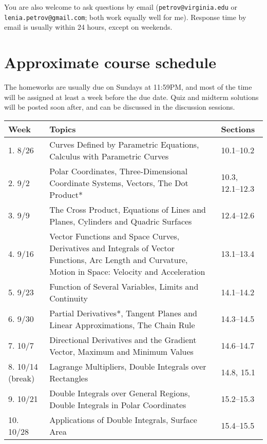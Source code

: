 \documentclass[oneside,11pt]{amsart}
\theoremstyle{definition}
\begin{document}
You are also welcome to ask questions by email (\texttt{petrov@virginia.edu} or
\texttt{lenia.petrov@gmail.com}; both work equally well for me). Response time by email is usually within 24 hours, except on weekends.

\section{Approximate course schedule}

The homeworks are usually due on Sundays at 11:59PM, and most of the time will be assigned at least a week before the due date. Quiz and midterm solutions will be posted soon after, and can be discussed in the discussion sessions.


\vspace{5pt}


\begin{center}
\begin{longtable}{|l|p{}|l|}
    \hline
    \textbf{Week} & \textbf{Topics} & \textbf{Sections} \\
    \hline
    1. 8/26 & Curves Defined by Parametric Equations, Calculus with Parametric Curves & 10.1--10.2 \\
    \hline
    2. 9/2 & Polar Coordinates, Three-Dimensional Coordinate Systems, Vectors, The Dot Product* & 10.3, 12.1--12.3 \\
    \hline
    3. 9/9 & The Cross Product, Equations of Lines and Planes, Cylinders and Quadric Surfaces & 12.4--12.6 \\
    \hline
		4. 9/16 & Vector Functions and Space Curves, Derivatives and Integrals of Vector Functions, Arc Length and Curvature,
		 Motion in Space: Velocity and Acceleration& 13.1--13.4 \\
    \hline
    5. 9/23 & Function of Several Variables, Limits and Continuity & 14.1--14.2 \\
    \hline
    6. 9/30 & Partial Derivatives*, Tangent Planes and Linear Approximations, The Chain Rule & 14.3--14.5 \\
    \hline
    7. 10/7 & Directional Derivatives and the Gradient Vector, Maximum and Minimum Values & 14.6--14.7 \\
    \hline
		8. 10/14 (break) & Lagrange Multipliers, Double Integrals over Rectangles & 14.8, 15.1 \\
    \hline
    9. 10/21 & Double Integrals over General Regions, Double Integrals in Polar Coordinates & 15.2--15.3 \\
    \hline
    10. 10/28 & Applications of Double Integrals, Surface Area & 15.4--15.5 \\

\end{longtable}
\end{center}
\end{document}
